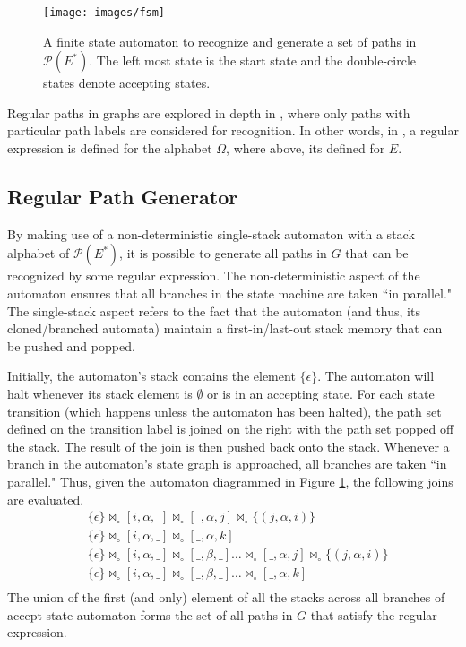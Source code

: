 \documentclass[10pt,conference,letterpaper]{IEEEtran}
\newcommand{\mca}{\mathcal}
\newcommand{\join}{\bowtie_\circ}
\begin{document}
\begin{figure}[h!]
	\centering
	\texttt{[image: images/fsm]}
	 \caption{\label{fig:fsm} A finite state automaton to recognize and generate a set of paths in $\mca{P}(E^*)$. The left most state is the start state and the double-circle states denote accepting states.}
\end{figure}

Regular paths in graphs are explored in depth in \cite{path:mendelzon1989}, where only paths with particular path labels are considered for recognition. In other words, in \cite{path:mendelzon1989}, a regular expression is defined for the alphabet $\Omega$, where above, its defined for $E$.

\subsection{Regular Path Generator\label{sec:generator}}

By making use of a non-deterministic single-stack automaton with a stack alphabet of $\mca{P}(E^*)$, it is possible to generate all paths in $G$ that can be recognized by some regular expression. The non-deterministic aspect of the automaton ensures that all branches in the state machine are taken ``in parallel." The single-stack aspect refers to the fact that the automaton (and thus, its cloned/branched automata) maintain a first-in/last-out stack memory that can be pushed and popped.

Initially, the automaton's stack contains the element $\{\epsilon\}$. The automaton will halt whenever its stack element is $\emptyset$ or is in an accepting state. For each state transition (which happens unless the automaton has been halted), the path set defined on the transition label is joined on the right with the path set popped off the stack. The result of the join is then pushed back onto the stack. Whenever a branch in the automaton's state graph is approached, all branches are taken ``in parallel." Thus, given the automaton diagrammed in Figure \ref{fig:fsm}, the following joins are evaluated.
\begin{align*}
& \{\epsilon\} \join [i,\alpha,\_] \join [\_, \alpha, j] \join \{(j,\alpha,i)\} \\
& \{\epsilon\} \join [i,\alpha,\_] \join [\_, \alpha, k] \\
& \{\epsilon\} \join [i,\alpha,\_] \join [\_,\beta,\_]  \ldots \join [\_, \alpha, j]  \join \{(j,\alpha,i)\} \\
& \{\epsilon\} \join [i,\alpha,\_] \join [\_,\beta,\_]  \ldots \join [\_, \alpha, k] \\
\end{align*}
The union of the first (and only) element of all the stacks across all branches of accept-state automaton forms the set of all paths in $G$ that satisfy the regular expression.
\end{document}
